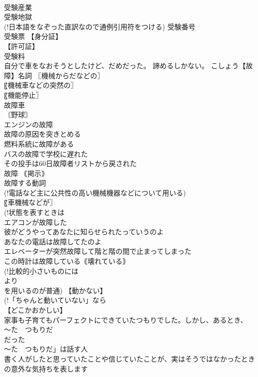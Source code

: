 \documentclass[8pt]{extreport}
\begin{document}
\begin{CJK}{UTF8}{min}
\\	受験産業 
\\	受験地獄 
\\	(!日本語をなぞった直訳なので通例引用符をつける) 受験番号 
\\	受験票 【身分証】
\\	【許可証】
\\	受験料 
\\	自分で車をなおそうとしたけど、だめだった。 諦めるしかない。		こしょう【故障】名詞 〖機械からだなどの〗
\\	〖機械車などの突然の〗
\\	〖機能停止〗
\\	故障車 
\\	[｟やや書｠ 
\\	故障者リストに載る[から復帰する] 〘野球〙
\\	エンジンの故障 
\\	故障の原因を突きとめる 
\\	燃料系統に故障がある 
\\	バスの故障で学校に遅れた 
\\	その投手は60日故障者リストから戻された 
\\	故障 ｟掲示｠
\\	故障する動詞 
\\	(!電話など主に公共性の高い機械機器などについて用いる) 
\\	〖車機械などが〗
\\	(!状態を表すときは 
\\	エアコンが故障した 
\\	彼がどうやってあなたに知らせられたっていうのよ
\\	あなたの電話は故障してたのよ 
\\	エレベーターが突然故障して階と階の間で止まってしまった 
\\	この時計は故障している｟壊れている｠ 
\\	(!比較的小さいものには 
\\	より 
\\	を用いるのが普通) 【動かない】
\\	(!「ちゃんと動いていない」なら 
\\	【どこかおかしい】
\\	家事も子育てもパーフェクトにできていたつもりでした。しかし、あるとき、
\\	〜た　つもりだ 
\\	だった 
\\	〜た　つもりだ」は話す人 
\\	書く人がしたと思っていたことや信じていたことが、実はそうではなかったときの意外な気持ちを表します

\end{CJK}
\end{document}
